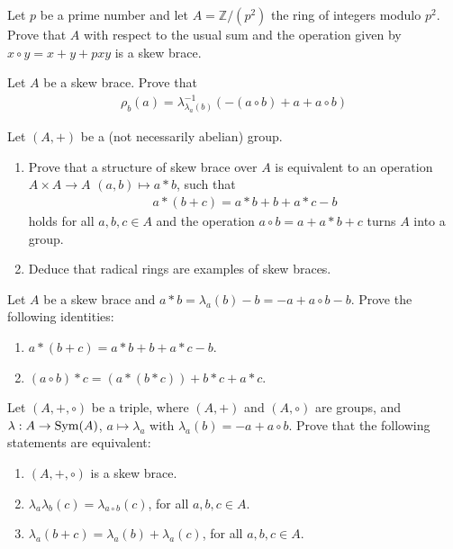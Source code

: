 \begin{exercise}
    Let $p$ be a prime number and let  $A=\mathbb{Z}/(p^2)$ the ring of integers modulo $p^2$. Prove that $A$ with respect to the usual sum and the operation given by $x \circ y = x+y+pxy$ is a skew brace.
\end{exercise}

\begin{exercise}
    Let $A$ be a skew brace. Prove that
    \begin{align*}
        \rho_b(a) = \lambda^{-1}_{\lambda_a(b)}(-(a\circ b) +a+a\circ b)
    \end{align*}
\end{exercise}

\begin{exercise}
    Let $(A,+)$ be a (not necessarily abelian) group. 
    \begin{enumerate}
        \item Prove that a structure of skew brace over $A$ is equivalent to an operation $A\times A \to A$ $(a,b)\mapsto a\ast b$, such that
        \begin{align*}
            a \ast (b+c) = a\ast b + b + a\ast c - b
        \end{align*}
        holds for all $a,b,c \in A$ and the operation $a\circ b = a+ a\ast b + c$ turns $A$ into a group.
        \item Deduce that radical rings are examples of skew braces. 
        \end{enumerate}
\end{exercise}

\begin{exercise}
    Let $A$ be a skew brace and $a\ast b = \lambda_a(b)-b = -a+a\circ b - b$. Prove the following identities:
    \begin{enumerate}
        \item $a\ast (b+c) = a\ast b + b +a\ast c -b$.
        \item $(a\circ b)\ast c = (a\ast(b\ast c)) + b\ast c + a\ast c$.
    \end{enumerate}
\end{exercise}

\begin{exercise}
    Let $(A,+,\circ)$ be a triple, where $(A,+)$ and $(A,\circ)$ are groups, and $\lambda: A \to \operatorname{Sym}(A)$, $a\mapsto \lambda_a$ with $\lambda_a(b)=-a+a\circ b$. Prove that the following statements are equivalent:
    \begin{enumerate}
        \item $(A,+,\circ)$ is a skew brace.
        \item $\lambda_a\lambda_b(c)=\lambda_{a\circ b}(c)$, for all $a,b,c\in A$.
        \item $\lambda_a(b+c) = \lambda_a(b)+\lambda_a(c)$, for all $a,b,c\in A$.
    \end{enumerate}
\end{exercise}

